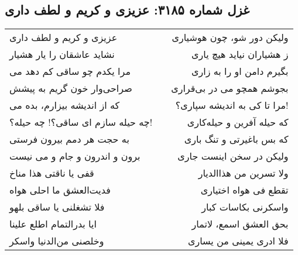 \begin{center}
\section*{غزل شماره ۳۱۸۵: عزیزی و کریم و لطف داری}
\label{sec:3185}
\begin{longtable}{l p{0.5cm} r}
عزیزی و کریم و لطف داری
&&
ولیکن دور شو، چون هوشیاری
\\
نشاید عاشقان را یار هشیار
&&
ز هشیاران نیاید هیچ یاری
\\
مرا یکدم چو ساقی کم دهد می
&&
بگیرم دامن او را به زاری
\\
صراحی‌وار خون گریم به پیشش
&&
بجوشم همچو می در بی‌قراری
\\
که از اندیشه بیزارم، بده می
&&
مرا تا کی به اندیشه سپاری؟!
\\
چه حیله سازم ای ساقی؟! چه حیله؟!
&&
که حیله آفرین و حیله‌کاری
\\
به حجت هر دمم بیرون فرستی
&&
که بس باغیرتی و تنگ باری
\\
برون و اندرون و جام و می نیست
&&
ولیکن در سخن اینست جاری
\\
قفی یا ناقتی هذا مناخ
&&
ولا تسرین من هذاالدیار
\\
فدیت‌العشق ما احلی هواه
&&
تقطع فی هواه اختیاری
\\
فلا تشغلنی یا ساقی بلهو
&&
واسکرنی بکاسات کبار
\\
ایا بدرالتمام اطلع علینا
&&
بحق العشق اسمع، لاتمار
\\
وخلصنی من‌الدنیا واسکر
&&
فلا ادری یمینی من یساری
\\
\end{longtable}
\end{center}
